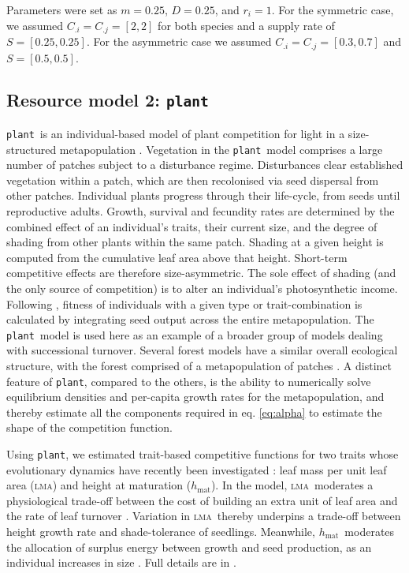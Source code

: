 \documentclass[a4paper,11pt]{article}
\newcommand{\plant}{{\tt plant}}
\newcommand{\hmat}{\ensuremath{h_{\text{mat}}}}
\newcommand{\lma}{\textsc{lma}}
\begin{document}
Parameters were set as $m = 0.25$, $D=0.25$, and $r_i = 1$. For the symmetric case, we assumed $C_{.i} = C_{.j} = [2,2]$ for both species and a supply rate of $S = [0.25, 0.25]$.  For the asymmetric case we assumed $C_{.i} = C_{.j} = [0.3,0.7]$ and $S = [0.5, 0.5]$.

\subsection{Resource model 2: \plant }

\plant\ is an individual-based model of plant competition for light in a size-structured metapopulation \citep{Falster-2016, Falster-2017}. Vegetation in the \plant\ model comprises a large number of patches subject to a disturbance regime. Disturbances clear established vegetation within a patch, which are then recolonised via seed dispersal from other patches. Individual plants progress through their life-cycle, from seeds until reproductive adults. Growth, survival and fecundity rates are determined by the combined effect of an individual's traits, their current size, and the degree of shading from other plants within the same patch. Shading at a given height is computed from the cumulative leaf area above that height. Short-term competitive effects are therefore size-asymmetric. The sole effect of shading (and the only source of competition) is to alter an individual's photosynthetic income. Following \citep{Falster-2017}, fitness of individuals with a given type or trait-combination is calculated by integrating seed output across the entire metapopulation. The \plant\ model is used here as an example of a broader group of models dealing with successional turnover. Several forest models have a similar overall ecological structure, with the forest comprised of a metapopulation of patches \citep{Huston-1987,Kohyama-1993,Moorcroft-2001, Medvigy-2012, Smith-2014}. A distinct feature of \plant, compared to the others, is the ability to numerically solve equilibrium densities and per-capita growth rates for the metapopulation, and thereby estimate all the components required in eq. \ref{eq:alpha} to estimate the shape of the competition function.

Using \plant, we estimated trait-based competitive functions for two traits whose evolutionary dynamics have recently been investigated \citep{Falster-2017}: leaf mass per unit leaf area (\lma) and height at maturation (\hmat). In the model, \lma\ moderates a physiological trade-off between the cost of building an extra unit of leaf area and the rate of leaf turnover \citep{Wright-2004}. Variation in \lma\ thereby underpins a trade-off between height growth rate and shade-tolerance of seedlings. Meanwhile, \hmat\ moderates the allocation of surplus energy between growth and seed production, as an individual increases in size \citep{Falster-2017}. Full details are in \citet{Falster-2016, Falster-2017}.
\end{document}
